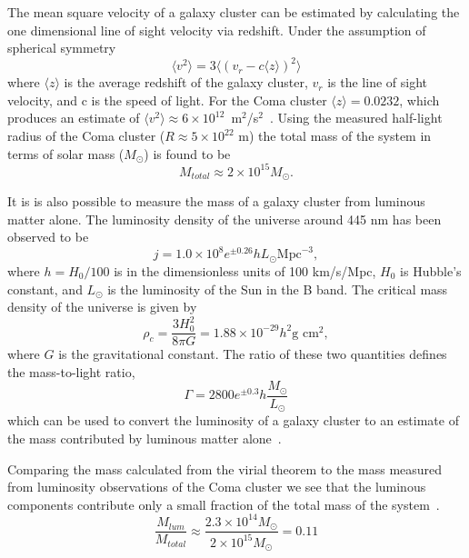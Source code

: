 The mean square velocity of a galaxy cluster can be estimated by calculating the one dimensional line of sight velocity via redshift.  Under the assumption of spherical symmetry
\begin{equation} \label{VirialTheorem7}
 \langle v^2 \rangle = 3 \langle (v_r - c \langle z \rangle)^2 \rangle
\end{equation} 
where $\langle z \rangle$ is the average redshift of the galaxy cluster, $v_r$ is the line of sight velocity, and c is the speed of light.  For the Coma cluster $\langle z \rangle = 0.0232$, which produces an estimate of $\langle v^2 \rangle \approx 6 \times 10^{12}$~m$^2$/s$^2$~\cite{ComaZ}.  Using the measured half-light radius of the Coma cluster ($R \approx 5 \times 10^{22}$ m) the total mass of the system in terms of solar mass ($M_{\odot}$) is found to be
\begin{equation} \label{VirialTheorem8}
M_{total} \approx 2 \times 10^{15} M_{\odot}.
\end{equation}

It is is also possible to measure the mass of a galaxy cluster from luminous matter alone.  The luminosity density of the universe around 445 nm has been observed to be 
\begin{equation}
j=1.0 \times 10^8 e^{\pm 0.26} h L_{\odot} \text{Mpc}^{-3},
\end{equation}
where $h=H_0/100$ is in the dimensionless units of 100 km/s/Mpc, $H_0$ is Hubble's constant, and $L_\odot$ is the luminosity of the Sun in the B band.  The critical mass density of the universe is given by
\begin{equation}
\rho_c = \frac{3H_0^2}{8 \pi G} = 1.88 \times 10^{-29} h^2 \text{g cm}^2,
\end{equation}
where $G$ is the gravitational constant.  The ratio of these two quantities defines the mass-to-light ratio, 
\begin{equation}
\Gamma = 2800 e^{\pm 0.3} h \frac{M_\odot}{L_\odot}
\end{equation}
which can be used to convert the luminosity of a galaxy cluster to an estimate of the mass contributed by luminous matter alone~\cite{Golwala}.

Comparing the mass calculated from the virial theorem to the mass measured from luminosity observations of the Coma cluster we see that the luminous components contribute only a small fraction of the total mass of the system~\cite{ComaZ}.
\begin{equation} \label{VirialTheorem9}
\frac{M_{lum}}{M_{total}} \approx \frac{2.3 \times 10^{14} M_{\odot}}{2 \times 10^{15} M_{\odot}} = 0.11
\end{equation}

